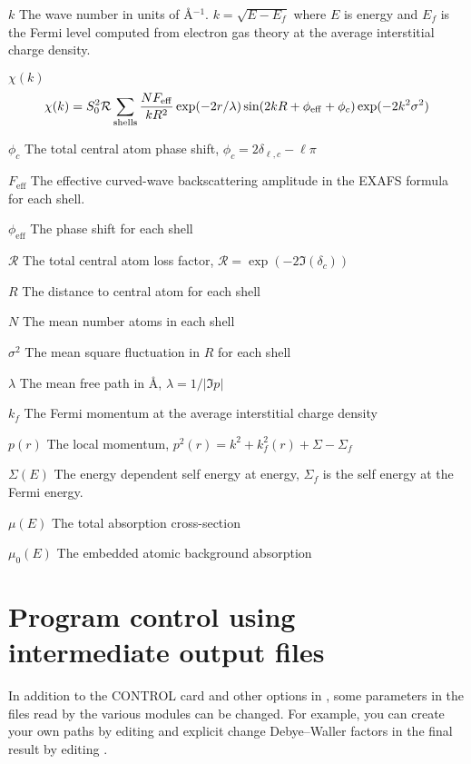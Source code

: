 \documentclass[11pt,oneside]{report} %
\begin{document}
\begin{Reflist}
\item[$k$] The wave number in units of \AA$^{-1}$.
  $k=\sqrt{E-E_f}$ where $E$ is energy and $E_f$ is the Fermi level
  computed from electron gas theory at the average interstitial charge
  density.
\item[$\chi(k)$]
  $$ \chi(k) = S_0^2  \mathcal{R}  \sum\limits_{\mathrm{shells}}
  \frac{NF_\mathrm{eff}}{kR^2} \exp(-2r/\lambda)
  \sin(2kR + \phi_{\mathrm{eff}} + \phi_c)
  \exp(-2k^2\sigma^2) \notag $$
\item[$\phi_c$]
  The total central atom phase shift, $\phi_c=2\delta_{\ell,c} - \ell\pi$
\item[$F_{\mathrm{eff}}$]
  The effective curved-wave backscattering amplitude in the EXAFS
  formula for each shell.
\item[$\phi_{\mathrm{eff}}$]
  The phase shift for each shell
\item[$\mathcal{R}$]
  The total central atom loss factor, $\mathcal{R}=\exp(-2\Im(\delta_c))$
\item[$R$]
  The distance to central atom for each shell
\item[$N$]
  The mean number atoms in each shell
\item[$\sigma^2$]
  The mean square fluctuation in $R$ for each shell
\item[$\lambda$]
  The mean free path in \AA, $\lambda = {1/ |\Im p |}$
\item[$k_f$]
  The Fermi momentum at the average interstitial charge density
\item[$p(r)$]
  The local momentum, $p^2(r)=k^2+k_f^2(r)+\Sigma-\Sigma_f$
\item[$\Sigma(E)$]
  The energy dependent self energy at energy, $\Sigma_f$ is the self
  energy at the Fermi energy.
\item[$\mu(E)$]
  The total absorption cross-section
\item[$\mu_0(E)$]
  The embedded atomic background absorption
\end{Reflist}





\section{Program control using intermediate output files}
\label{sec:Addit-progr-contr}




In addition to the CONTROL card and other options in ,
some parameters in the files read by the various modules can be
changed.  For example, you can create your own paths by editing
 and explicit change Debye--Waller factors in the
final result by editing .
\end{document}
